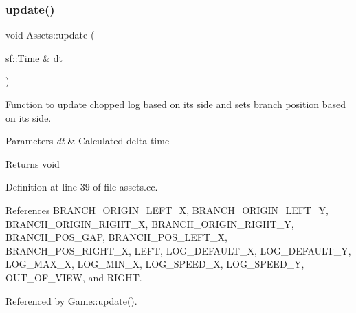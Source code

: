 \subsubsection{\texorpdfstring{update()}{update()}}
{\footnotesize\ttfamily void Assets\+::update (\begin{DoxyParamCaption}\item[{sf\+::\+Time \&}]{dt }\end{DoxyParamCaption})}



Function to update chopped log based on it\textquotesingle{}s side and sets branch position based on it\textquotesingle{}s side. 


\begin{DoxyParams}{Parameters}
{\em dt} & Calculated delta time \\
\hline
\end{DoxyParams}
\begin{DoxyReturn}{Returns}
void 
\end{DoxyReturn}


Definition at line 39 of file assets.\+cc.



References B\+R\+A\+N\+C\+H\+\_\+\+O\+R\+I\+G\+I\+N\+\_\+\+L\+E\+F\+T\+\_\+X, B\+R\+A\+N\+C\+H\+\_\+\+O\+R\+I\+G\+I\+N\+\_\+\+L\+E\+F\+T\+\_\+Y, B\+R\+A\+N\+C\+H\+\_\+\+O\+R\+I\+G\+I\+N\+\_\+\+R\+I\+G\+H\+T\+\_\+X, B\+R\+A\+N\+C\+H\+\_\+\+O\+R\+I\+G\+I\+N\+\_\+\+R\+I\+G\+H\+T\+\_\+Y, B\+R\+A\+N\+C\+H\+\_\+\+P\+O\+S\+\_\+\+G\+AP, B\+R\+A\+N\+C\+H\+\_\+\+P\+O\+S\+\_\+\+L\+E\+F\+T\+\_\+X, B\+R\+A\+N\+C\+H\+\_\+\+P\+O\+S\+\_\+\+R\+I\+G\+H\+T\+\_\+X, L\+E\+FT, L\+O\+G\+\_\+\+D\+E\+F\+A\+U\+L\+T\+\_\+X, L\+O\+G\+\_\+\+D\+E\+F\+A\+U\+L\+T\+\_\+Y, L\+O\+G\+\_\+\+M\+A\+X\+\_\+X, L\+O\+G\+\_\+\+M\+I\+N\+\_\+X, L\+O\+G\+\_\+\+S\+P\+E\+E\+D\+\_\+X, L\+O\+G\+\_\+\+S\+P\+E\+E\+D\+\_\+Y, O\+U\+T\+\_\+\+O\+F\+\_\+\+V\+I\+EW, and R\+I\+G\+HT.



Referenced by Game\+::update().



